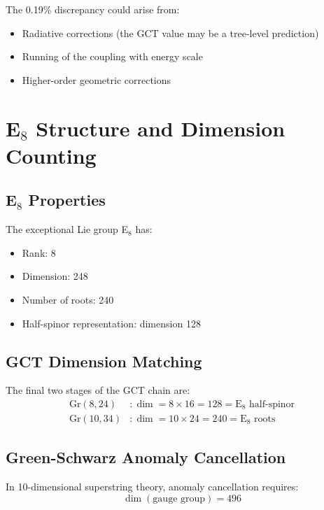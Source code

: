 \documentclass[11pt,a4paper]{article}
\newcommand{\Gr}{\mathrm{Gr}}
\begin{document}
The 0.19\% discrepancy could arise from:
\begin{itemize}
    \item Radiative corrections (the GCT value may be a tree-level prediction)
    \item Running of the coupling with energy scale
    \item Higher-order geometric corrections
\end{itemize}

\section{E$_8$ Structure and Dimension Counting}

\subsection{E$_8$ Properties}

The exceptional Lie group E$_8$ has:
\begin{itemize}
    \item Rank: 8
    \item Dimension: 248
    \item Number of roots: 240
    \item Half-spinor representation: dimension 128
\end{itemize}

\subsection{GCT Dimension Matching}

The final two stages of the GCT chain are:
\begin{align}
    \Gr(8, 24) &: \dim = 8 \times 16 = 128 = \text{E}_8 \text{ half-spinor} \\
    \Gr(10, 34) &: \dim = 10 \times 24 = 240 = \text{E}_8 \text{ roots}
\end{align}

\subsection{Green-Schwarz Anomaly Cancellation}

In 10-dimensional superstring theory, anomaly cancellation requires:
\begin{equation}
    \dim(\text{gauge group}) = 496
\end{equation}
\end{document}
